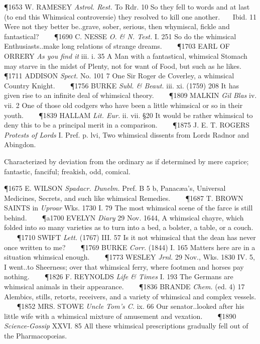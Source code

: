 \begin{description}[wide, labelwidth=!, labelindent=0pt]
\begin{myenumerate}
\P 1653 W. RAMESEY  \textit{Astrol. Rest.} To Rdr. 10 So they fell to words and at last (to end this Whimsical controversie) they resolved to kill one another.    Ibid. 11 Were not they better be..grave, sober, serious, then whymiscal, fickle and fantastical?    
\P 1690 C. NESSE  \textit{O. \& N. Test.} I. 251 So do the whimsical Enthusiasts..make long relations of strange dreams.    
\P 1703 EARL OF ORRERY  \textit{As you find it} iii. i. 35 A Man with a fantastical, whimsical Stomach may starve in the midst of Plenty, not for want of Food, but such as he likes.    
\P 1711 ADDISON  \textit{Spect.} No. 101 7 One Sir Roger de Coverley, a whimsical Country Knight.    
\P 1756 BURKE  \textit{Subl. \& Beaut.} iii. xi. (1759) 208 It has given rise to an infinite deal of whimsical theory.    
\P 1809 MALKIN  \textit{Gil Blas} iv. vii. 2 One of those old codgers who have been a little whimsical or so in their youth.    
\P 1839 HALLAM  \textit{Lit. Eur.} ii. vii. §20 It would be rather whimsical to deny this to be a principal merit in a comparison.    
\P 1875 J. E. T.  ROGERS \textit{Protests of Lords} I. Pref. p. lvi, Two whimsical dissents from Lords Radnor and Abingdon.

 Characterized by deviation from the ordinary as if determined by mere caprice; fantastic, fanciful; freakish, odd, comical.

\P 1675 E. WILSON  \textit{Spadacr. Dunelm.} Pref. B 5 b, Panacæa's, Universal Medicines, Secrets, and such like whimsical Remedies.    
\P 1687 T. BROWN SAINTS in  \textit{Uproar} Wks. 1730 I. 79 The  most whimsical scene of the farce is still behind.    
\P a1700 EVELYN  \textit{Diary} 29 Nov. 1644, A whimsical chayre, which folded into so many varieties as to turn into a bed, a bolster, a table, or a couch.    
\P 1710 SWIFT  \textit{Lett.} (1767) III. 57 Is it not whimsical that the dean has never once written to me?    
\P 1769 BURKE  \textit{Corr.} (1844) I. 165 Matters here are in a situation whimsical enough.    
\P 1773 WESLEY  \textit{Jrnl.} 29 Nov., Wks. 1830 IV. 5, I went..to Sheerness; over that whimsical ferry, where footmen and horses pay nothing.    
\P 1826 F. REYNOLDS  \textit{Life \& Times} I. 193 The Germans are whimsical animals in their appearance.    
\P 1836 BRANDE  \textit{Chem.} (ed. 4) 17 Alembics, stills, retorts, receivers, and a variety of whimsical and complex vessels.    
\P 1852 MRS. STOWE  \textit{Uncle Tom's C.} ix. 66 Our senator..looked after his little wife with a whimsical mixture of amusement and vexation.    
\P 1890 \textit{Science-Gossip} XXVI. 85 All these whimsical prescriptions gradually fell out of the Pharmacopœias.


\end{myenumerate}
\end{description}
